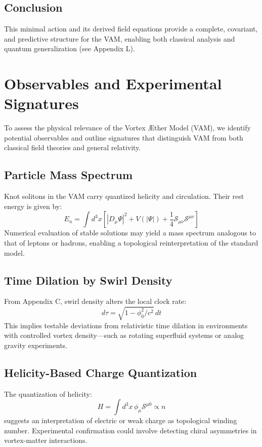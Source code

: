 \subsection{Conclusion}
This minimal action and its derived field equations provide a complete, covariant, and predictive structure for the VAM, enabling both classical analysis and quantum generalization (see Appendix L).

\section{Observables and Experimental Signatures}
To assess the physical relevance of the Vortex \AE{}ther Model (VAM), we identify potential observables and outline signatures that distinguish VAM from both classical field theories and general relativity.

\subsection{Particle Mass Spectrum}
Knot solitons in the VAM carry quantized helicity and circulation. Their rest energy is given by:
\begin{equation}
    E_n = \int d^3x \left[ |D_\mu \Psi|^2 + V(|\Psi|) + \frac{1}{4} \mathcal{S}_{\mu\nu} \mathcal{S}^{\mu\nu} \right]
\end{equation}
Numerical evaluation of stable solutions may yield a mass spectrum analogous to that of leptons or hadrons, enabling a topological reinterpretation of the standard model.

\subsection{Time Dilation by Swirl Density}
From Appendix C, swirl density alters the local clock rate:
\begin{equation}
    d\tau = \sqrt{1 - \phi_0^2 / c^2} \, dt
\end{equation}
This implies testable deviations from relativistic time dilation in environments with controlled vortex density—such as rotating superfluid systems or analog gravity experiments.

\subsection{Helicity-Based Charge Quantization}
The quantization of helicity:
\begin{equation}
    H = \int d^3x \, \phi_\mu \mathcal{S}^{\mu0} \propto n
\end{equation}
suggests an interpretation of electric or weak charge as topological winding number. Experimental confirmation could involve detecting chiral asymmetries in vortex-matter interactions.

